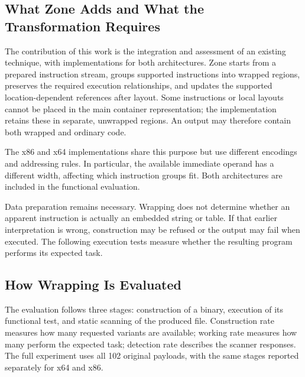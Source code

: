 \subsection{What Zone Adds and What the Transformation Requires}
The contribution of this work is the integration and assessment of an
existing technique, with implementations for both architectures. Zone
starts from a prepared instruction stream, groups supported instructions
into wrapped regions, preserves the required execution relationships, and
updates the supported location-dependent references after layout. Some
instructions or local layouts cannot be placed in the main container
representation; the implementation retains these in separate, unwrapped
regions. An output may therefore contain both wrapped and ordinary code.

The x86 and x64 implementations share this purpose but use different
encodings and addressing rules. In particular, the available immediate
operand has a different width, affecting which instruction groups fit.
Both architectures are included in the functional evaluation.

Data preparation remains necessary. Wrapping does not determine whether
an apparent instruction is actually an embedded string or table. If that
earlier interpretation is wrong, construction may be refused or the output
may fail when executed. The following execution tests measure whether the resulting program
performs its expected task.

\subsection{How Wrapping Is Evaluated}
The evaluation follows three stages: construction of a binary, execution
of its functional test, and static scanning of the produced file.
Construction rate measures how many requested variants are available;
working rate measures how many perform the expected task; detection rate
describes the scanner responses. The full experiment uses all 102 original
payloads, with the same stages reported separately for x64 and x86.
